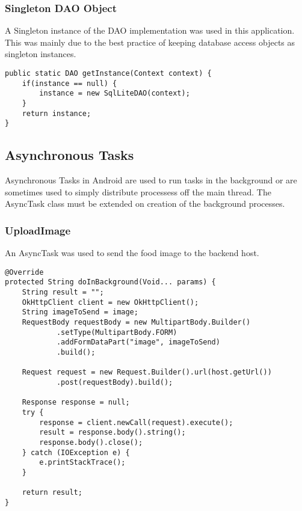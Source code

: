 \subsubsection*{Singleton DAO Object}
A Singleton instance of the DAO implementation was used in this application.
This was mainly due to the best practice of keeping database access objects as singleton instances.
\begin{lstlisting}[style=Java]
public static DAO getInstance(Context context) {
    if(instance == null) {
        instance = new SqlLiteDAO(context);
    }
    return instance;
}
\end{lstlisting}

\subsection*{Asynchronous Tasks}
Asynchronous Tasks in Android are used to run tasks in the background or are sometimes used to simply distribute processess off the main thread.
The AsyncTask class must be extended on creation of the background processes.

\subsubsection*{UploadImage}
An AsyncTask was used to send the food image to the backend host.
\begin{lstlisting}[style=Java]
@Override
protected String doInBackground(Void... params) {
    String result = "";
    OkHttpClient client = new OkHttpClient();
    String imageToSend = image;
    RequestBody requestBody = new MultipartBody.Builder()
            .setType(MultipartBody.FORM)
            .addFormDataPart("image", imageToSend)
            .build();

    Request request = new Request.Builder().url(host.getUrl())
            .post(requestBody).build();

    Response response = null;
    try {
        response = client.newCall(request).execute();
        result = response.body().string();
        response.body().close();
    } catch (IOException e) {
        e.printStackTrace();
    }

    return result;
}
\end{lstlisting}

